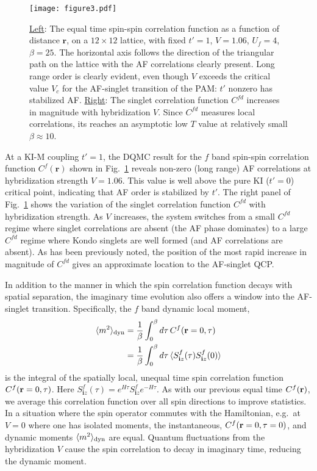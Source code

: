 \documentclass[pra,letterpaper,10pt,twocolumn]{revtex4}
\begin{document}
\begin{figure}[!h]
\texttt{[image: figure3.pdf]} 
\caption{
\underline{Left}: The equal time spin-spin correlation function as a function of distance
$\textbf{r}$, on a $12\times 12$ lattice, with fixed $t'=1$, $V=1.06$,
$U_f=4$, $\beta=25$. The horizontal axis follows the direction of the
triangular path on the lattice with the AF correlations clearly
present. Long range order is clearly evident, even though
$V$ exceeds the critical value $V_c$ for the AF-singlet transition of
the PAM:  $t'$ nonzero has stabilized AF.
\underline{Right}: The singlet correlation function $C^{fd}$
increases in magnitude with
hybridization $V$.  Since $C^{fd}$ measures local correlations,
its reaches an asymptotic low $T$ value at relatively small
$\beta \approx 10$.
\label{fig:KIM_spsp}
}
\end{figure}

At a KI-M coupling $t'=1$, 
the DQMC result for the
$f$ band spin-spin correlation function $C^f(\textbf{r})$ shown
in Fig.~\ref{fig:KIM_spsp} reveals non-zero (long range) 
AF correlations at hybridization strength $V=1.06$. 
This value is well above the pure KI ($t'=0$) critical point,
indicating that AF order is stabilized by $t'$.
The right panel of Fig.~\ref{fig:KIM_spsp}
shows the variation of the singlet correlation function $C^{fd}$ with
hybridization strength. As $V$ increases,
the system switches from a small $C^{fd}$ regime
where singlet correlations are absent (the AF phase dominates) to a
large $C^{fd}$ regime where Kondo singlets are well formed (and AF
correlations are absent).
As has been previously noted\cite{Vekic95}, 
the position of the most rapid increase in magnitude
of $C^{fd}$ gives an approximate location to the AF-singlet QCP.

In addition to the manner in which the spin correlation function decays with
spatial separation, the 
imaginary time evolution also offers a window into the AF-singlet
transition.  Specifically, the $f$ band dynamic local moment,
\begin{align}
  \langle m^2\rangle_{\rm dyn}
&=\frac{1}{\beta}\int^{\beta}_0 d\tau 
\, C^f({\bf r}=0,\tau) 
\nonumber \\
&=\frac{1}{\beta}\int^{\beta}_0 d\tau 
\, \langle S^f_{\textbf{i}z}(\tau)S^f_{\textbf{i}z}(0) \rangle
\label{eq:dy_moment}
\end{align}
is the integral of the spatially local, unequal time
spin correlation function 
$C^f({\bf r}=0,\tau)$.
Here $S^f_{\textbf{i}z}(\tau)=e^{H\tau} S^f_{\textbf{i}z} e^{-H\tau}$.
As with our previous equal time 
$C^f({\bf r})$, we average this correlation function over
all spin directions to improve statistics.
In a situation where the spin operator commutes with the Hamiltonian,
e.g.~at $V=0$ where one has isolated moments, the instantaneous,
$C^f({\bf r}=0,\tau=0)$,
and dynamic moments 
$\langle m^2 \rangle_{\rm dyn}$
are equal.  Quantum fluctuations from the hybridization
$V$ cause the spin correlation to decay in imaginary time, 
reducing the dynamic moment.
\end{document}
